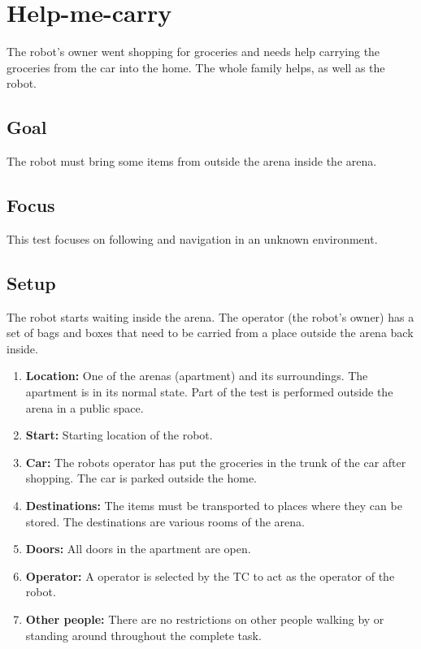 \section{Help-me-carry}
The robot's owner went shopping for groceries and needs help carrying the groceries from the car into the home.
The whole family helps, as well as the robot. 

\subsection{Goal}
The robot must bring some items from outside the arena inside the arena.

\subsection{Focus}
This test focuses on following and navigation in an unknown environment. 

\subsection{Setup}
The robot starts waiting inside the arena. 
The operator (the robot's owner) has a set of bags and boxes that need to be carried from a place outside the arena back inside. 

\begin{enumerate}
  \item \textbf{Location:} One of the arenas (apartment) and its surroundings. The apartment is in its normal state. Part of the test is performed outside the arena in a public space.
  \item \textbf{Start:} Starting location of the robot. %
  \item \textbf{Car:} The robots operator has put the groceries in the trunk of the car after shopping. The car is parked outside the home.
  \item \textbf{Destinations:} The items must be transported to places where they can be stored. The destinations are various rooms of the arena. 
  \item \textbf{Doors:} All doors in the apartment are open.
  \item \textbf{Operator:} A  operator is selected by the TC to act as the operator of the robot. 
  \item \textbf{Other people:} There are no restrictions on other people walking by or standing around throughout the complete task. 
\end{enumerate}

